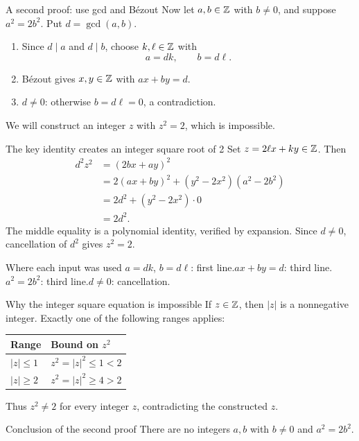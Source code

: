 \begin{frame}{A second proof: use gcd and B\'ezout}
Now let $a,b\in\mathbb{Z}$ with $b\ne0$, and suppose $a^2=2b^2$.
Put $d=\gcd(a,b)$.
\begin{enumerate}
\item Since $d\mid a$ and $d\mid b$, choose $k,\ell\in\mathbb{Z}$ with
\[
a=dk,\qquad b=d\ell.
\]
\item B\'ezout gives $x,y\in\mathbb{Z}$ with $ax+by=d$.
\item $d\ne0$: otherwise $b=d\ell=0$, a contradiction.
\end{enumerate}
We will construct an integer $z$ with $z^2=2$, which is impossible.
\end{frame}

\begin{frame}{The key identity creates an integer square root of 2}
Set $z=2\ell x+ky\in\mathbb{Z}$. Then
\[
\begin{aligned}
d^2z^2
  &=(2bx+ay)^2\\
  &=2(ax+by)^2+(y^2-2x^2)(a^2-2b^2)\\
  &=2d^2+(y^2-2x^2)\cdot0\\
  &=2d^2.
\end{aligned}
\]
The middle equality is a polynomial identity, verified by expansion.
Since $d\ne0$, cancellation of $d^2$ gives $z^2=2$.
\begin{block}{Where each input was used}
$a=dk$, $b=d\ell$: first line.\quad $ax+by=d$: third line.\quad
$a^2=2b^2$: third line.\quad $d\ne0$: cancellation.
\end{block}
\end{frame}

\begin{frame}{Why the integer square equation is impossible}
If $z\in\mathbb{Z}$, then $|z|$ is a nonnegative integer. Exactly one of the following ranges applies:
\begin{center}
\begin{tabular}{ll}
\toprule
Range & Bound on $z^2$\\\midrule
$|z|\le1$ & $z^2=|z|^2\le1<2$\\[2mm]
$|z|\ge2$ & $z^2=|z|^2\ge4>2$\\\bottomrule
\end{tabular}
\end{center}
Thus $z^2\ne2$ for every integer $z$, contradicting the constructed $z$.
\begin{block}{Conclusion of the second proof}
There are no integers $a,b$ with $b\ne0$ and $a^2=2b^2$.
\end{block}
\end{frame}

